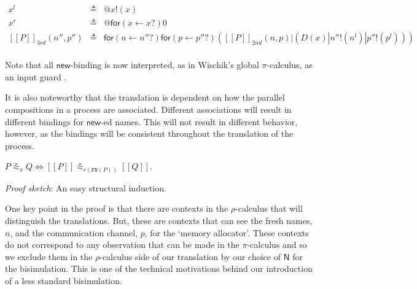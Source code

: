\documentclass{llncs}
\makeatletter
\newcommand{\pic}{$\pi$-calculus}
\newcommand{\ldb}{[\![}
\newcommand{\rdb}{]\!]}
\newcommand{\wbbisim}{\stackrel{\centerdot}{\approx}} %
\newcommand{\pzero}{\mathbin{0}}
\newcommand{\binpar}[2]{#1 | #2}
\newcommand{\outputp}[2]{#1!(#2)}
\newcommand{\prefix}[3]{\mathsf{for}(#2 \leftarrow #1?) #3}
\newcommand{\quotep}[1]{\mathsf{@}#1}
\newcommand{\meaningof}[1]{\ldb #1 \rdb}
\newcommand{\rhoc}{$\rho$-calculus}
\makeatother
\begin{document}
\begin{eqnarray*}
	x^{l} & \triangleq & \quotep{\outputp{x}{x}} \\
	x^{r} & \triangleq & \quotep{\prefix{x}{x}{\pzero}} \\
	\meaningof{P}_{3rd}( n'', p'' ) 
		& \triangleq & 
			\prefix{n''}{n}{\prefix{p''}{p}{(\binpar{\meaningof{P}_{2nd}(  n, p )}
							        {(\binpar{D(x)}{\binpar{\outputp{n''}{n^{l}}}{\outputp{p''}{p^{l}}}})})}} \\
\end{eqnarray*}

\begin{remark}
	Note that all $\mathsf{new}$-binding is now interpreted, as in Wischik's
	global $\pi$-calculus, as an input guard \cite{globalpi}.
\end{remark}
	
\begin{remark}
	It is also noteworthy that the translation is dependent on how
	the parallel compositions in a process are
	associated. Different associations will result in different
	bindings for $\mathsf{new}$-ed names. This will not result in different
	behavior, however, as the bindings will be consistent
	throughout the translation of the process.
\end{remark}

\begin{theorem}[Correctness]	
	$P \wbbisim_{\pi} Q \iff \ldb P \rdb \wbbisim_{r(\texttt{FN}(P))} \ldb Q \rdb$.
\end{theorem}

\emph{Proof sketch}: An easy structural induction.

One key point in the proof is that there are contexts in the {\rhoc}
that will distinguish the translations. But, these are contexts that
can see the fresh names, $n$, and the communication channel, $p$, for
the `memory allocator'. These contexts do not correspond to any
observation that can be made in the {\pic} and so we exclude them in
the {\rhoc} side of our translation by our choice of ${\mathsf N}$
for the bisimulation. This is one of the technical motivations behind
our introduction of a less standard bisimulation.
\end{document}
